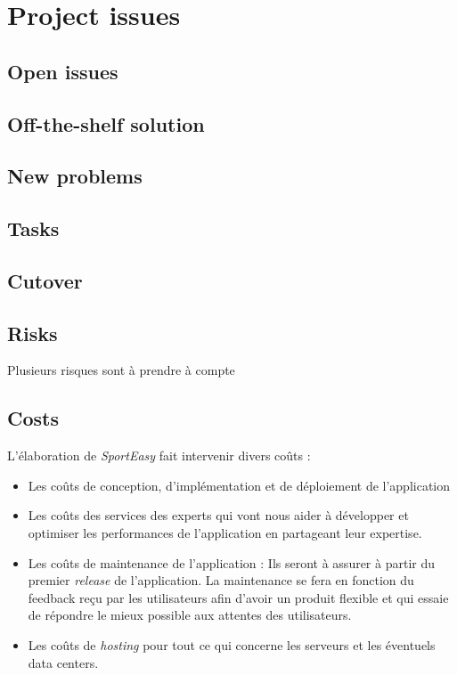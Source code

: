 \chapter{Project issues}

\section{Open issues}

\section{Off-the-shelf solution}

\section{New problems}

\section{Tasks}

\section{Cutover}

\section{Risks}

Plusieurs risques sont à prendre à compte

\section{Costs}

L'élaboration de \textit{SportEasy} fait intervenir divers coûts :

\begin{itemize}

\item Les coûts de conception, d'implémentation et de déploiement de l'application

\item Les coûts des services des experts qui vont nous aider à développer et optimiser les performances de l'application en partageant leur expertise.

\item Les coûts de maintenance de l'application : Ils seront à assurer à partir du premier \textit{release} de l'application. La maintenance se fera en fonction du feedback reçu par les utilisateurs afin d'avoir un produit flexible et qui essaie de répondre le mieux possible aux attentes des utilisateurs.

\item Les coûts de \textit{hosting} pour tout ce qui concerne les serveurs et les éventuels data centers.

\end{itemize}

